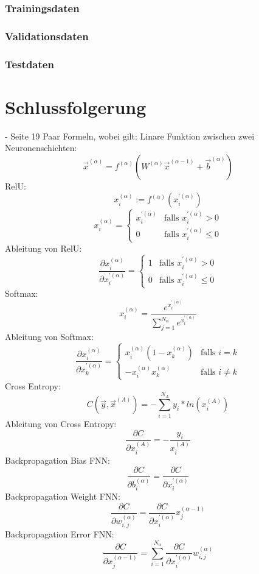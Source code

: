 \documentclass[11pt]{article}
\begin{document}
\subsubsection{Trainingsdaten}
\subsubsection{Validationsdaten}
\subsubsection{Testdaten}


\section{Schlussfolgerung}
- Seite 19
Paar Formeln, wobei gilt:
Linare Funktion zwischen zwei Neuronenschichten:
\[ \vec{x}^{(\alpha)}=f^{(\alpha)}(W^{(\alpha)} \vec{x}^{(\alpha-1)} + \vec{b}^{(\alpha)}) \]
RelU:
\[ x_i^{(\alpha)} := f^{(\alpha)}(x_i^{'(\alpha)}) \]
\[ x_i^{(\alpha)}= \left\{
	\begin{array}{ll}
		x_i^{'(\alpha)}  & \mbox{falls } x_i^{'(\alpha)} > 0 \\
		0 & \mbox{falls } x_i^{'(\alpha)} \leq 0
	\end{array}
\right. \]
Ableitung von RelU:
\[ \frac{\partial x_i^{(\alpha)}}{\partial x_i^{'(\alpha)}} = \left\{
	\begin{array}{ll}
		1  & \mbox{falls } x_i^{'(\alpha)} > 0 \\
		0 & \mbox{falls } x_i^{'(\alpha)} \leq 0
	\end{array}
\right. \]
Softmax:
\[ x_i^{(\alpha)} = \frac{e^{x_i^{'(\alpha)}}}{\sum_{j=1}^{N_{\alpha}} e^{x_i^{'(\alpha)}}} \]
Ableitung von Softmax:
\[ \frac{\partial x_i^{(\alpha)}}{\partial x_k^{'(\alpha)}} = \left\{
	\begin{array}{ll}
		x_i^{(\alpha)}(1-x_k^{(\alpha)})  & \mbox{falls } i = k \\
		-x_i^{(\alpha)}x_k^{(\alpha)} & \mbox{falls } i \neq k
	\end{array}
\right. \]
Cross Entropy:
\[ C(\vec{y},\vec{x}^{(A)}) = -\sum_{i=1}^{N_A} y_i * ln(x_i^{(A)}) \]
Ableitung von Cross Entropy:
\[ \frac{\partial C}{\partial x_i^{(A)}} = -\frac{y_i}{x_i^{(A)}} \]
Backpropagation Bias FNN:
\[ \frac{\partial C}{\partial b_i^{(\alpha)}} = \frac{\partial C}{\partial x_i^{'(\alpha)}} \]
Backpropagation Weight FNN:
\[ \frac{\partial C}{\partial w_{i,j}^{(\alpha)}} = \frac{\partial C}{\partial x_i^{'(\alpha)}} x_j^{(\alpha-1)} \]
Backpropagation Error FNN:
\[ \frac{\partial C}{\partial x_{j}^{(\alpha-1)}} = \sum_{i=1}^{N_{\alpha}} \frac{\partial C}{\partial x_i^{'(\alpha)}} w_{i,j}^{(\alpha)} \]
\end{document}
